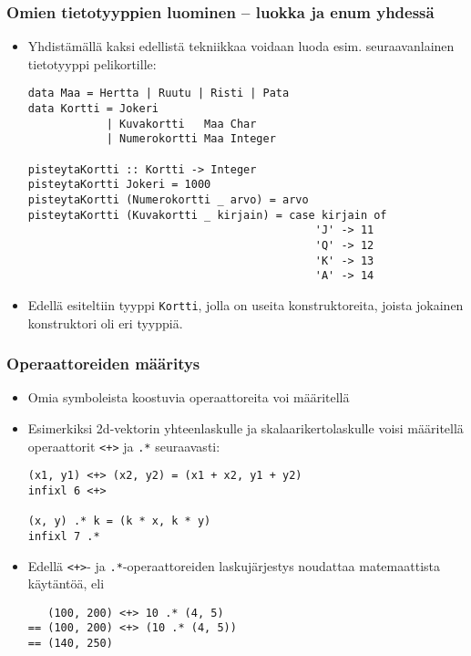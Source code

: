 \documentclass{beamer}
\begin{document}
\begin{frame}[fragile]
\frametitle{Omien tietotyyppien luominen -- luokka ja enum yhdessä}
\begin{itemize}
\item{Yhdistämällä kaksi edellistä tekniikkaa voidaan luoda esim. seuraavanlainen tietotyyppi pelikortille:}
\begin{verbatim}
data Maa = Hertta | Ruutu | Risti | Pata
data Kortti = Jokeri
            | Kuvakortti   Maa Char
            | Numerokortti Maa Integer

pisteytaKortti :: Kortti -> Integer
pisteytaKortti Jokeri = 1000
pisteytaKortti (Numerokortti _ arvo) = arvo
pisteytaKortti (Kuvakortti _ kirjain) = case kirjain of
                                            'J' -> 11
                                            'Q' -> 12
                                            'K' -> 13
                                            'A' -> 14
\end{verbatim}
\item{Edellä esiteltiin tyyppi \texttt{Kortti}, jolla on useita konstruktoreita, joista jokainen konstruktori oli eri tyyppiä.}
\end{itemize}
\end{frame}

\begin{frame}[fragile]
\frametitle{Operaattoreiden määritys}

\begin{itemize}

\item{Omia symboleista koostuvia operaattoreita voi määritellä}
\item{Esimerkiksi 2d-vektorin yhteenlaskulle ja skalaarikertolaskulle voisi määritellä operaattorit \texttt{<+>} ja \texttt{.*} seuraavasti:}
\begin{verbatim}
(x1, y1) <+> (x2, y2) = (x1 + x2, y1 + y2)
infixl 6 <+>

(x, y) .* k = (k * x, k * y)
infixl 7 .*
\end{verbatim}
\item{Edellä \texttt{<+>}- ja \texttt{.*}-operaattoreiden laskujärjestys noudattaa matemaattista käytäntöä, eli}
\begin{verbatim}
   (100, 200) <+> 10 .* (4, 5)
== (100, 200) <+> (10 .* (4, 5))
== (140, 250)
\end{verbatim}
\end{itemize}

\end{frame}
\end{document}
